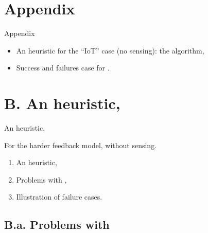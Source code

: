\documentclass[12pt,english,ignorenonframetext,]{beamer}
\providecommand{\tightlist}{%
  \setlength{\itemsep}{0pt}\setlength{\parskip}{0pt}}
\begin{document}
\appendix{}


\section{\hfill{}Appendix\hfill{}}

\begin{frame}{Appendix}

\begin{itemize}\tightlist
\item
  An heuristic for the ``IoT'' case (no sensing): the \Selfish{} algorithm,
\item
  Success and failures case for \Selfish{}.
\end{itemize}

\end{frame}



\section{\hfill{}B. An heuristic, \Selfish\hfill{}}

\begin{frame}{An heuristic, \Selfish}

For the harder feedback model, without sensing.

\begin{enumerate}
\def\labelenumi{\arabic{enumi}.}
\tightlist
\item
  An heuristic,\vspace*{15pt}
\item
  Problems with \Selfish,\vspace*{15pt}
\item
  Illustration of failure cases.
\end{enumerate}

\end{frame}



\subsection{\hfill{}B.a. Problems with \Selfish\hfill{}}
\end{document}
